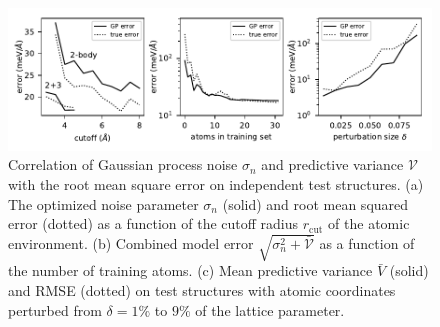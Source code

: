 \documentclass[%
superscriptaddress,
preprint,
linenumbers,
amsmath,amssymb,
aps,
prl,
]{revtex4-1}
\begin{document}
\begin{figure}
	\centering
	\includegraphics[width=7in]{calibrate.pdf}
	\caption{Correlation of Gaussian process noise $\sigma_n$ and predictive variance $\mathcal{V}$ with the root mean square error on independent test structures. (a) The optimized noise parameter $\sigma_n$ (solid) and root mean squared error (dotted) as a function of the cutoff radius $r_{\text{cut}}$ of the atomic environment. (b) Combined model error $\sqrt{\sigma_n^2 + \bar{\mathcal{V}}}$ as a function of the number of training atoms. (c) Mean predictive variance $\bar{V}$ (solid) and RMSE (dotted) on test structures with atomic coordinates perturbed from $\delta = 1\%$ to $9\%$ of the lattice parameter.}
\end{figure}
\end{document}
